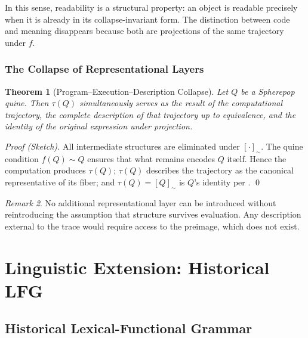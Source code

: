 \documentclass[12pt, oneside]{amsbook}
\theoremstyle{plain}
\newtheorem{theorem}{Theorem}[section]
\theoremstyle{definition}
\theoremstyle{remark}
\newtheorem{remark}[theorem]{Remark}
\newcommand{\evalf}{f}
\newcommand{\trace}{\tau}
\newcommand{\tequiv}{\sim}
\begin{document}
In this sense, readability is a structural property: an object is readable
precisely when it is already in its collapse-invariant form. The distinction
between code and meaning disappears because both are projections of the same
trajectory under $\evalf$.

\section{The Collapse of Representational Layers}
\label{sec:pec:mainthm}

\begin{theorem}[Program--Execution--Description Collapse]
\label{thm:pec}
  Let $Q$ be a Spherepop quine. Then $\trace(Q)$ simultaneously serves as the
  result of the computational trajectory, the complete description of that
  trajectory up to equivalence, and the identity of the original expression
  under projection.
\end{theorem}

\begin{proof}[Proof (Sketch)]
All intermediate structures are eliminated under $[\cdot]_{\tequiv}$. The
quine condition $\evalf(Q) \tequiv Q$ ensures that what remains encodes $Q$
itself. Hence the computation produces $\trace(Q)$; $\trace(Q)$ describes the
trajectory as the canonical representative of its fiber; and $\trace(Q) =
[Q]_{\tequiv}$ is $Q$'s identity per . \qed
\end{proof}

\begin{remark}
No additional representational layer can be introduced without reintroducing
the assumption that structure survives evaluation. Any description external to
the trace would require access to the preimage, which does not exist.
\end{remark}

\part{Linguistic Extension: Historical LFG}

\chapter{Historical Lexical-Functional Grammar}
\label{ch:hlfg}
\end{document}
